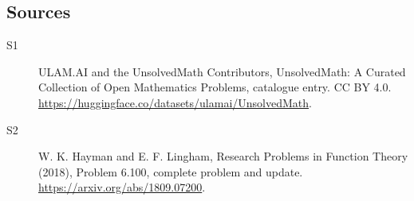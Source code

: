 \documentclass[11pt]{article}
\begin{document}
\subsection{Sources}
\begin{description}
\item[\hypertarget{source:statement:1}{S1}] ULAM.AI and the UnsolvedMath Contributors, UnsolvedMath: A Curated Collection of Open Mathematics Problems, catalogue entry. CC BY 4.0. \url{https://huggingface.co/datasets/ulamai/UnsolvedMath}.
\item[\hypertarget{source:statement:2}{S2}] W. K. Hayman and E. F. Lingham, Research Problems in Function Theory (2018), Problem 6.100, complete problem and update. \url{https://arxiv.org/abs/1809.07200}.
\end{description}
\label{end:statement}
\end{document}
